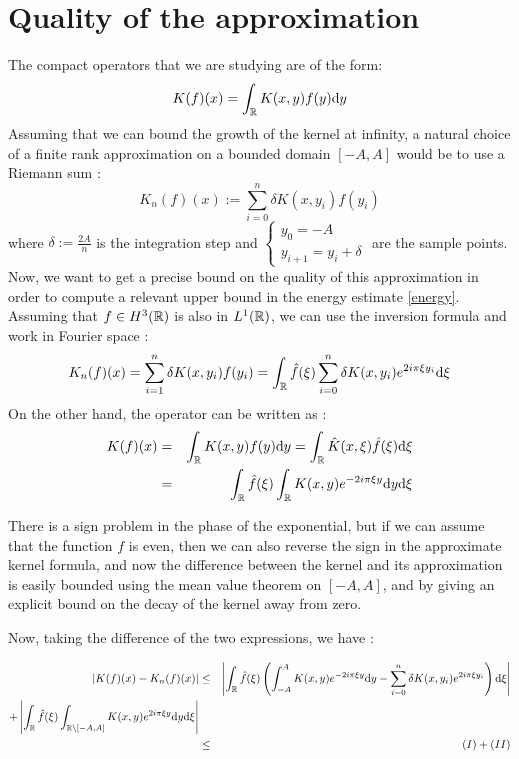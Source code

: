 \documentclass[11pt,a4paper]{article}
\begin{document}
\newpage

\section{Quality of the approximation}
The compact operators that we are studying are of the form: \[K(f)(x) = \int_\mathbb R K(x,y)f(y)\mathrm{d}y \]
Assuming that we can bound the growth of the kernel at infinity, a natural choice of a finite rank approximation on a bounded domain $[-A,A]$ would be to use a Riemann sum : \[K_n(f)(x) := \sum_{i=0}^n \delta K(x,y_i)f(y_i)\]
where $\delta := \frac{2A}{n}$ is the integration step and $\begin{cases} y_0=-A \\ y_{i+1}=y_i + \delta \end{cases}$ are the sample points. \\

Now, we want to get a precise bound on the quality of this approximation in order to compute a relevant upper bound in the energy estimate \ref{energy}. \\
Assuming that $f\in H^3(\mathbb R)$ is also in $L^1(\mathbb R)$, we can use the inversion formula and work in Fourier space :
\begin{equation}\label{int_finite}
K_n(f)(x) =  \sum_{i=1}^n\delta K(x,y_i)f(y_i) = \int_\mathbb R \hat{f}(\xi)\sum_{i=0}^n \delta K(x,y_i) e^{2i\pi\xi y_i}\mathrm{d}\xi
\end{equation}
On the other hand, the operator can be written as :
\begin{eqnarray*}
K(f)(x) &=& \int_\mathbb R K(x,y)f(y)\mathrm{d}y = \int_\mathbb R \hat{K}(x,\xi)\hat{f}(\xi)\mathrm{d}\xi \\
&=& \int_\mathbb R \hat{f}(\xi) \int_\mathbb R K(x,y)e^{-2i\pi\xi y}\mathrm{d}y \mathrm{d}\xi 
\end{eqnarray*}

There is a sign problem in the phase of the exponential, but if we can assume that the function $f$ is even, then we can also reverse the sign in the approximate kernel formula, and now the difference between the kernel and its approximation is easily bounded using the mean value theorem on $[-A,A]$, and by giving an explicit bound on the decay of the kernel away from zero. 

Now, taking the difference of the two expressions, we have :

\begin{eqnarray*}
\left| K(f)(x) - K_n(f)(x)\right| &\leq& \left|  \int_\mathbb R \hat{f}(\xi) \left(\int_{-A}^A K(x,y)e^{-2i\pi\xi y}\mathrm{d}y - \sum_{i=0}^n \delta K(x,y_i) e^{2i\pi\xi y_i} \right)\mathrm{d}\xi \right| \\ + \left|\int_\mathbb R \hat{f}(\xi) \int_{\mathbb R \setminus [-A,A]} K(x,y)e^{2i\pi\xi y}\mathrm{d}y\mathrm{d}\xi \right| \\
&\leq& (I) + (II)
\end{eqnarray*}
\end{document}
